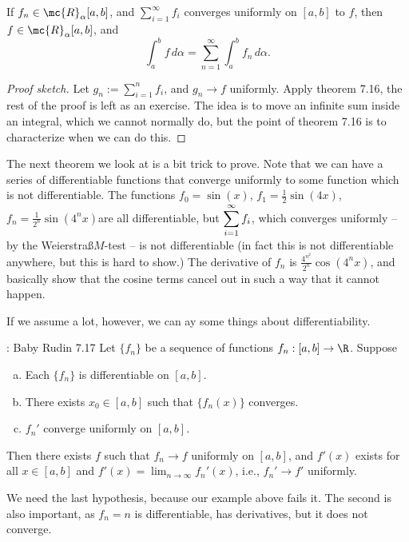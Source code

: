 \begin{ncorollary}
	If \(f_n\in\mc{R}_{\alpha}[a,b]\), and \(\displaystyle\sum_{i=1}^{\infty} f_i\) converges uniformly on \([a,b]\) to \(f\), then \(f\in\mc{R}_{\alpha}[a,b]\), and 
	\begin{equation*}
		\int_a^b f \, d\alpha=\sum_{n=1}^{\infty} \int_a^b f_n \, d\alpha.
	\end{equation*}
\end{ncorollary}
\begin{proof}[Proof sketch]
	Let \(g_n:=\displaystyle\sum_{i=1}^{n} f_i\), and \(g_n\to f\) uniformly. Apply theorem 7.16, the rest of the proof is left as an exercise. The idea is to move an infinite sum inside an integral, which we cannot normally do, but the point of theorem 7.16 is to characterize when we can do this.
\end{proof}
The next theorem we look at is a bit trick to prove. Note that we can have a series of differentiable functions that converge uniformly to some function which is not differentiable. The functions \(f_0=\sin{(x)}\), \(f_1=\displaystyle\frac{1}{2}\sin{(4x)}\), \(f_n=\displaystyle\frac{1}{2^n}\sin{(4^n x)}\)are all differentiable, but \(\displaystyle\displaystyle\sum_{i=1}^{\infty} f_i\), which converges uniformly -- by the Weierstra\ss \(M\)-test -- is not differentiable (in fact this is not differentiable anywhere, but this is hard to show.) The derivative of \(f_n\) is \(\displaystyle\frac{4^{n^2}}{2^n}\cos{(4^n x)}\), and basically show that the cosine terms cancel out in such a way that it cannot happen.

\medskip

If we assume a lot, however, we can ay some things about differentiability.

\begin{ntheorem}{: Baby Rudin 7.17}
	Let \(\{f_n\}\) be a sequence of functions \(f_n:[a,b]\to\R\). Suppose 
	\begin{enumerate}[(a)]
		\item Each \(\{f_n\}\) is differentiable on \([a,b]\).
		
		\item There exists \(x_0\in[a,b]\) such that \(\{f_n(x)\}\) converges.
		
		\item \(f_n'\) converge uniformly on \([a,b]\).
	\end{enumerate}
	Then there exists \(f\) such that \(f_n\to f\) uniformly on \([a,b]\), and \(f'(x)\) exists for all \(x\in [a,b]\) and \(f'(x)=\displaystyle\lim_{n\to\infty}f_n'(x)\), i.e., \(f_n'\to f'\) uniformly.
\end{ntheorem}
We need the last hypothesis, because our example above fails it. The second is also important, as \(f_n=n\) is differentiable, has derivatives, but it does not converge.

